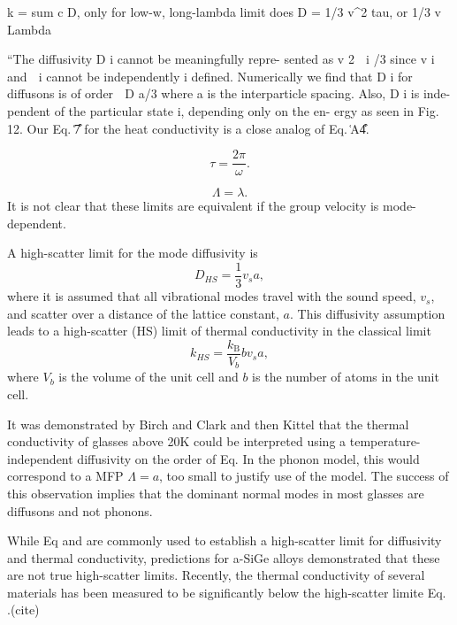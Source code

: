 \documentclass[aps,prb,twocolumn,superscriptaddress,footinbib,amsmath,amssymb,floatfix]{revtex4}
\begin{document}
k = sum c D, only for low-w, long-lambda limit does 
D = 1/3 v^2 tau, or 1/3 v Lambda

``The diffusivity D i cannot be meaningfully repre-
sented as v 2 ␶ i /3 since v i and ␶ i cannot be independently
i
defined. Numerically we find that D i for diffusons is of order
␻ D a/3 where a is the interparticle spacing. Also, D i is inde-
pendent of the particular state i, depending only on the en-
ergy as seen in Fig. 12. Our Eq. ͑7͒ for the heat conductivity
is a close analog of Eq. ͑A4͒.

\begin{equation}\label{EQ:IR}
\tau = \frac{2\pi}{\omega}.
\end{equation}

\begin{equation}\label{EQ:IR}
\Lambda = \lambda.
\end{equation}
It is not clear that these limits are equivalent if the group velocity 
is mode-dependent.

A high-scatter limit for the mode diffusivity is
\begin{equation}\label{EQ:M:D_HS}
D_{HS} = \frac{1}{3} v_s a,
\end{equation}
where it is assumed that all vibrational modes travel with the sound speed, 
$v_s$, and scatter over a distance of the lattice constant, $a$. This 
diffusivity assumption leads to a high-scatter (HS) limit of thermal 
conductivity in the classical limit\cite{cahill_lattice_1988} 
\begin{equation}\label{EQ:M:k_AF,HS}
k_{HS} = \frac{k_{\text{B}}}{V_b}b v_s a,
\end{equation}
where $V_b$ is the volume of the unit cell and $b$ is the number of atoms 
in the unit cell. 

It was demonstrated by Birch and Clark and then Kittel that  
the thermal conductivity of glasses above 20K could be interpreted 
using a temperature-independent diffusivity on the order of Eq. 
In the phonon model, this would correspond to a MFP $\Lambda = a$, 
too small to justify use of the model. The success of this observation
implies that the dominant normal modes in most glasses are diffusons and 
not phonons. 

While Eq and are commonly used to establish a high-scatter limit for 
diffusivity and thermal conductivity, predictions for a-SiGe alloys 
demonstrated that these are not true high-scatter limits.
\cite{feldman_thermal_1993} Recently, the thermal conductivity 
of several materials has been measured to be significantly below the 
high-scatter limite Eq. .(cite) 
\end{document}

